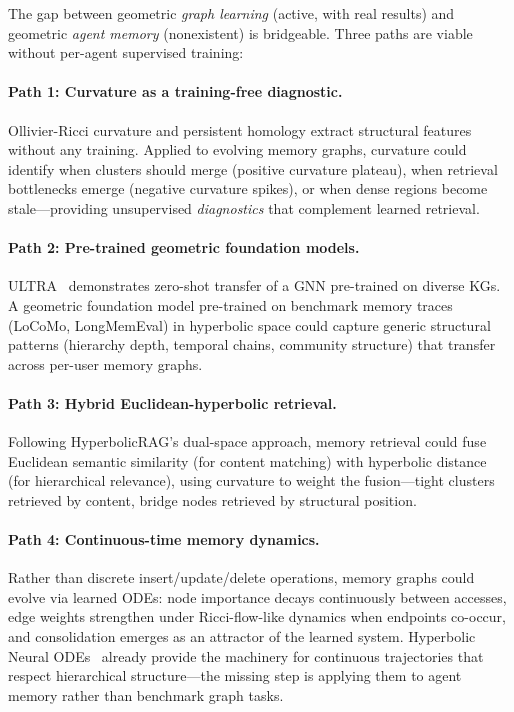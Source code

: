 \documentclass[hf]{ceurart}
\begin{document}
The gap between geometric \emph{graph learning} (active, with real
results) and geometric \emph{agent memory} (nonexistent) is bridgeable.
Three paths are viable without per-agent supervised training:

\paragraph{Path 1: Curvature as a training-free diagnostic.}
Ollivier-Ricci curvature and persistent homology extract structural
features without any training. Applied to evolving memory graphs,
curvature could identify when clusters should merge (positive
curvature plateau), when retrieval bottlenecks emerge (negative
curvature spikes), or when dense regions become stale---providing
unsupervised \emph{diagnostics} that complement learned retrieval.

\paragraph{Path 2: Pre-trained geometric foundation models.}
ULTRA~\cite{ultrag2026} demonstrates zero-shot transfer of a GNN
pre-trained on diverse KGs. A geometric foundation model pre-trained
on benchmark memory traces (LoCoMo, LongMemEval) in hyperbolic space
could capture generic structural patterns (hierarchy depth, temporal
chains, community structure) that transfer across per-user memory
graphs.

\paragraph{Path 3: Hybrid Euclidean-hyperbolic retrieval.}
Following HyperbolicRAG's dual-space approach, memory retrieval could
fuse Euclidean semantic similarity (for content matching) with
hyperbolic distance (for hierarchical relevance), using curvature to
weight the fusion---tight clusters retrieved by content, bridge nodes
retrieved by structural position.

\paragraph{Path 4: Continuous-time memory dynamics.}
Rather than discrete insert/update/delete operations, memory graphs
could evolve via learned ODEs: node importance decays continuously
between accesses, edge weights strengthen under Ricci-flow-like
dynamics when endpoints co-occur, and consolidation emerges as an
attractor of the learned system. Hyperbolic Neural
ODEs~\cite{hyperbolicneuralode2023} already provide the machinery for
continuous trajectories that respect hierarchical structure---the
missing step is applying them to agent memory rather than benchmark
graph tasks.
\end{document}
